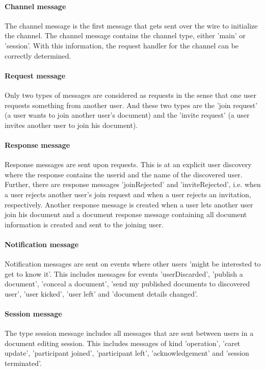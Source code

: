 \paragraph{Channel message}
The channel message is the first message that gets sent over the wire to initialize the channel. The channel message contains the channel type, either 'main' or 'session'. With this information, the request handler for the channel can be correctly determined.

\paragraph{Request message}
Only two types of messages are considered as requests in the sense that one user requests something from another user. And these two types are the 'join request' (a user wants to join another user's document) and the 'invite request' (a user invites another user to join his document).

\paragraph{Response message}
Response messages are sent upon requests. This is at an explicit user discovery where the response contains the userid and the name of the discovered user. Further, there are response messages 'joinRejected' and 'inviteRejected', i.e. when a user rejects another user's join request and when a user rejects an invitation, respectively. Another response message is created when a user lets another user join his document and a document response message containing all document information is created and sent to the joining user.

\paragraph{Notification message}
Notification messages are sent on events where other users 'might be interested to get to know it'. This includes messages for events 'userDiscarded', 'publish a document', 'conceal a document', 'send my published documents to discovered user', 'user kicked', 'user left' and 'document details changed'.

\paragraph{Session message}
The type session message includes all messages that are sent between users in a document editing session. This includes messages of kind 'operation', 'caret update', 'participant joined', 'participant left', 'acknowledgement' and 'session terminated'.


